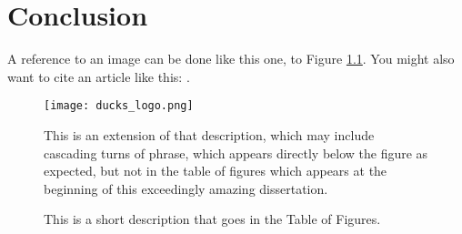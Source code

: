 \chapter{Conclusion}

A reference to an image can be done like this one, to Figure \ref{ducks}. You might also want to cite an article like this: \cite{interesting_article}.

\begin{figure}[ht!]
\centering
\texttt{[image: ducks\_logo.png]}
\caption{\label{ducks}This is a short description that goes in the Table of Figures.}{This is an extension of that description, which may include cascading turns of phrase, which appears directly below the figure as expected, but not in the table of figures which appears at the beginning of this exceedingly amazing dissertation.}
\end{figure}
